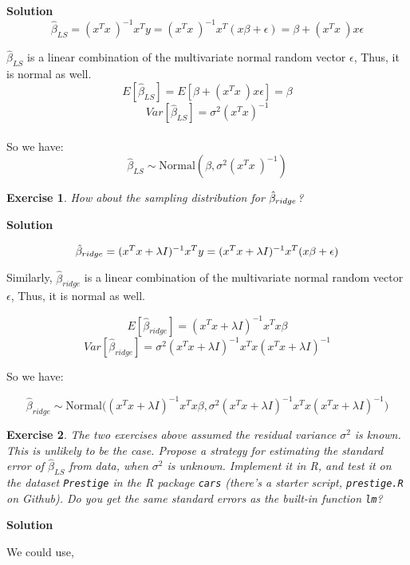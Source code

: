 \documentclass[twoside]{article}
\newcounter{lecnum}
\newtheorem{exercise}{Exercise}[lecnum]
\begin{document}
\color{blue}
\textbf{Solution}
$$ \hat{\beta}_{LS} =(  x^Tx\ )^{-1}    x^Ty  = (  x^Tx\ )^{-1}    x^T (x \beta + \epsilon) = \beta + (  x^Tx\ )x\epsilon  $$

$\hat{\beta}_{LS} $ is a linear combination of the multivariate normal random vector $\epsilon$,
Thus, it is normal as well. 
$$E[ \hat{\beta}_{LS} ] = E[ \beta + (  x^Tx\ )x\epsilon ] = \beta$$ 
$$Var[\hat{\beta}_{LS}]=\sigma^2 (x^Tx)^{-1}  $$ \\
So we have:
$$\hat{\beta}_{LS}  \sim \mbox{Normal} (\beta,\sigma^2  (x^Tx\ )^{-1} ) $$

\color{black}


\begin{exercise}
  How about the sampling distribution for $\hat{\beta}_{\small{ridge}}$?
\end{exercise}

\color{blue}
\textbf{Solution}

$$ \hat{\beta}_{\small{ridge}} =  (  x^T x + \lambda I  )^{-1}   x ^T y =   (  x^T x + \lambda I  )^{-1}   x ^T (x \beta + \epsilon)  $$


Similarly, $\hat{\beta}_{ridge} $ is a linear combination of the multivariate normal random vector $\epsilon$,
Thus, it is normal as well.

$$E[\hat{\beta}_{ridge}] =  (x^T x + \lambda I  )^{-1}   x ^T x\beta  $$ 
$$Var[\hat{\beta}_{ridge}] = \sigma^2 ( x^T x + \lambda I  )^{-1}   x ^T x ( x^T x + \lambda I  )^{-1}    $$

So we have:

$$\hat{\beta}_{ridge}\sim \mbox{Normal} \bigg( (x^T x + \lambda I  )^{-1}   x ^T x\beta,  \sigma^2 ( x^T x + \lambda I  )^{-1}   x ^T x ( x^T x + \lambda I  )^{-1 }  \bigg) $$

\color{black}


\begin{exercise}
  The two exercises above assumed the residual variance $\sigma^2$ is known. This is unlikely to be the case. Propose a strategy for estimating the standard error of $\hat{\beta}_{LS}$ from data, when $\sigma^2$ is unknown. Implement it in R, and test it on the dataset \texttt{Prestige} in the R package \texttt{cars} (there's a starter script, \texttt{prestige.R} on Github). Do you get the same standard errors as the built-in function \texttt{lm}?
\end{exercise}

\color{blue}
\textbf{Solution}

We could use,
\end{document}
